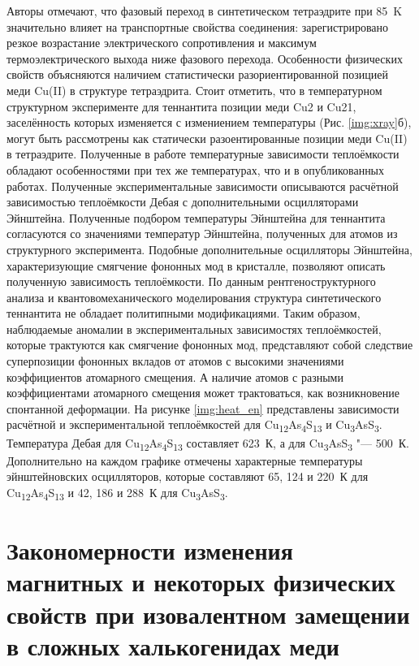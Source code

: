 Авторы \cite{Lara-Curzio2014} отмечают, что фазовый переход в синтетическом тетраэдрите при 85~K значительно  влияет на транспортные свойства соединения: зарегистрировано резкое возрастание электрического сопротивления и максимум термоэлектрического выхода ниже фазового перехода. 
Особенности физических свойств объясняются наличием статистически разориентированной позицией меди Cu(II) в структуре тетраэдрита. Стоит отметить, что в температурном структурном эксперименте для теннантита позиции меди Cu2 и Cu21, заселённость которых изменяется с измениением температуры (Рис. \ref{img:xray}б), могут быть рассмотрены как статически разоентированные позиции меди Cu(II) в тетраэдрите.
Полученные в работе температурные  зависимости теплоёмкости обладают особенностями при тех же температурах, что и в опубликованных работах. 
Полученные экспериментальные зависимости описываются расчётной зависимостью теплоёмкости Дебая с дополнительными осцилляторами Эйнштейна.
Полученные подбором температуры Эйнштейна для теннантита согласуются со значениями температур Эйнштейна, полученных для атомов из структурного эксперимента.
Подобные дополнительные осцилляторы Эйнштейна, характеризующие смягчение фононных мод в кристалле\cite{bab_81}, позволяют описать полученную зависимость теплоёмкости.
По данным рентгеноструктурного анализа и квантовомеханического моделирования структура синтетического теннантита не обладает политипными модификациями. Таким образом, наблюдаемые аномалии в экспериментальных зависимостях теплоёмкостей, которые трактуются как смягчение фононных мод, представляют собой следствие суперпозиции фононных вкладов от атомов с высокими значениями коэффициентов атомарного смещения.
А наличие атомов с разными коэффициентами атомарного смещения может трактоваться, как возникновение спонтанной деформации\cite{bab_1982,bab_81}.
На рисунке \ref{img:heat_en} представлены зависимости расчётной и экспериментальной теплоёмкостей для  Cu\textsubscript{12}As\textsubscript{4}S\textsubscript{13} и Cu\textsubscript{3}AsS\textsubscript{3}.
Температура Дебая для Cu\textsubscript{12}As\textsubscript{4}S\textsubscript{13} составляет 623~К, а для Cu\textsubscript{3}AsS\textsubscript{3} "--- 500~К.
Дополнительно на каждом графике отмечены характерные температуры эйнштейновских осцилляторов, которые составляют 65, 124 и 220~К для Cu\textsubscript{12}As\textsubscript{4}S\textsubscript{13} и 42, 186 и 288~К для Cu\textsubscript{3}AsS\textsubscript{3}.
\clearpage

\newpage

\section{Закономерности изменения магнитных и некоторых физических свойств при изовалентном замещении в сложных халькогенидах меди} \label{sect3_3}


